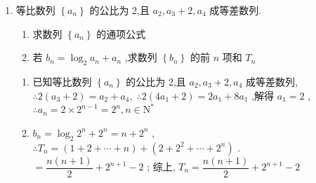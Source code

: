 \begin{enumerate}
\begin{jieda}
        $q > 1$ 时, ${d}_{n} > 0,\dfrac{{d}_{n + 1}}{{d}_{n}} = \dfrac{q\left( {n + 1}\right) }{n + 2}$ ,若数列 $\left\{  {d}_{n}\right\}$ 单调递增,则 $\dfrac{q\left( {n + 1}\right) }{n + 2} > 1$ ,即 $q > \dfrac{n + 2}{n + 1}$ ,由 $n \in  {\mathrm{N}}^{ * }$ ,需要 $q > \dfrac{3}{2}$ ,故 $\mathrm{B}$ 选项错误; ${d}_{1} > {d}_{2}$ 时, $\dfrac{{a}_{1}\left( {q - 1}\right) }{2} > \dfrac{{a}_{1}q\left( {q - 1}\right) }{3}$ ,解得 $1 < q < \dfrac{3}{2}$ , $q > 1$ 时, ${d}_{n} > 0$ ,由 $\dfrac{{d}_{n + 1}}{{d}_{n}} = \dfrac{q\left( {n + 1}\right) }{n + 2}$ ,若数列 $\left\{  {d}_{n}\right\}$ 单调递减,则 $\dfrac{q\left( {n + 1}\right) }{n + 2} < 1$ ,即 $q < \dfrac{n + 2}{n + 1} = 1 + \dfrac{1}{n + 1}$ ,而 $1 < q < \dfrac{3}{2}$ 不能满足 $q < 1 + \dfrac{1}{n + 1}\left( {n \in  {\mathrm{N}}^{ * }}\right)$ 恒成立, $\mathrm{C}$ 选项错误; ${d}_{1} < {d}_{2}$ 时, $\dfrac{{a}_{1}\left( {q - 1}\right) }{2} < \dfrac{{a}_{1}q\left( {q - 1}\right) }{3}$ ,解得 $0 < q < 1$ 或 $q > \dfrac{3}{2}$ ,由 $\mathrm{{AB}}$ 选项的解析可知,数列 $\left\{  {d}_{n}\right\}$ 单调递增, D 选项正确.
    \end{jieda}
    \item 等比数列 $\left\{  {a}_{n}\right\}$ 的公比为 2,且 ${a}_{2},{a}_{3} + 2,{a}_{4}$ 成等差数列. 
    \begin{enumerate}
        \item 求数列 $\left\{  {a}_{n}\right\}$ 的通项公式
        \item 若 ${b}_{n} = {\log }_{2}{a}_{n} + {a}_{n}$ ,求数列 $\left\{  {b}_{n}\right\}$ 的前 $n$ 项和 ${T}_{n}$
    \end{enumerate}
    \begin{jieda}
        \begin{enumerate}
            \item 已知等比数列 $\left\{  {a}_{n}\right\}$ 的公比为 2,且 ${a}_{2},{a}_{3} + 2,{a}_{4}$ 成等差数列, $\therefore 2\left( {{a}_{3} + 2}\right)  = {a}_{2} + {a}_{4},\;\therefore 2\left( {4{a}_{1} + 2}\right)  = 2{a}_{1} + 8{a}_{1}$ ,解得 ${a}_{1} = 2$ , $\therefore {a}_{n} = 2 \times  {2}^{n - 1} = {2}^{n},n \in  {\mathrm{N}}^{ * }$
            \item ${b}_{n} = {\log }_{2}{2}^{n} + {2}^{n} = n + {2}^{n}$ , $\therefore {T}_{n} = \left( {1 + 2 + \cdots  + n}\right)  + \left( {2 + {2}^{2} + \cdots  + {2}^{n}}\right)$ . $= \dfrac{n\left( {n + 1}\right) }{2} + {2}^{n + 1} - 2$ ; 综上, ${T}_{n} = \dfrac{n\left( {n + 1}\right) }{2} + {2}^{n + 1} - 2$
        \end{enumerate}
    \end{jieda}
    

\end{enumerate}
